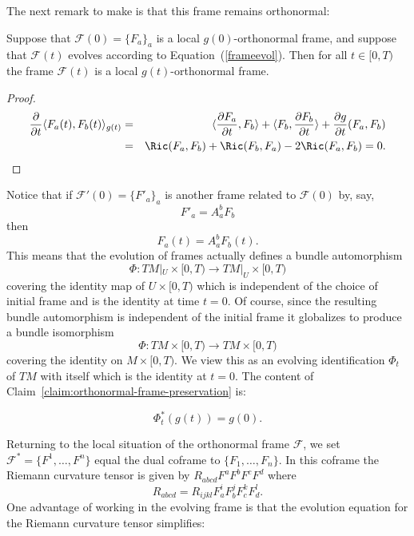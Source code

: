The next remark to make is that this frame remains orthonormal:

\begin{claim}\label{claim:orthonormal-frame-preservation}
\label{ortho}
 Suppose that ${\mathcal F}(0)=\{F_a\}_a$ is a local  $g(0)$-orthonormal frame,
  and suppose that ${\mathcal F}(t)$ evolves according to Equation~(\ref{frameevol}). Then
 for all $t\in [0,T)$ the frame ${\mathcal F}(t)$ is a local $g(t)$-orthonormal frame.
\end{claim}

\begin{proof}
\begin{eqnarray*}
\frac{\partial}{\partial t}\langle F_a(t),F_b(t)\rangle_{g(t)} & = & \langle
\frac{\partial F_a}{\partial t},F_b\rangle + \langle F_b,\frac{\partial
F_b}{\partial t}\rangle +
\frac {\partial g}{\partial t}(F_a,F_b) \\
 & = & \Ric(F_a,F_b)+\Ric(F_b,F_a)-2\Ric(F_a,F_b)=0.
\end{eqnarray*}
\end{proof}

Notice that if ${\mathcal F}'(0)=\{F'_a\}_a$ is another
frame related to ${\mathcal F}(0)$ by, say,
$$F'_a=A^b_aF_b$$
then $$F_a(t)=A^b_aF_b(t).$$ This means that the evolution of frames
actually defines a bundle automorphism
$$\Phi\colon TM|_U\times [0,T)\to TM|_U\times [0,T)$$
covering the identity map of $U\times[0,T)$ which is independent of
the choice of initial frame and is the identity at time $t=0$. Of
course, since the resulting bundle automorphism is independent of
the initial frame it globalizes to produce a bundle isomorphism
$$\Phi\colon TM\times[0,T)\to TM\times [0,T)$$
covering the identity on $M\times [0,T)$. We view this as an
evolving identification $\Phi_t$ of $TM$ with itself which is the
identity at $t=0$. The content of Claim~\ref{claim:orthonormal-frame-preservation} is:

\begin{corollary}\label{cor:pullback-metric-constant}
$$\Phi_t^*(g(t))=g(0).$$
\end{corollary}

Returning to the local situation of the orthonormal frame ${\mathcal
F}$, we set ${\mathcal F}^*=\{F^1,\ldots, F^n\}$ equal the dual
coframe to $\{F_1,\ldots,F_n\}$. In this coframe the Riemann
curvature tensor is given by $R_{abcd}F^aF^bF^cF^d$ where
\begin{equation}\label{framecoord} R_{abcd} =
R_{ijkl}F^{i}_{a}F^{j}_{b}F^{k}_{c}F^{l}_{d}.\end{equation} One
advantage of working in the evolving frame is that the evolution
equation for the Riemann curvature tensor simplifies:


